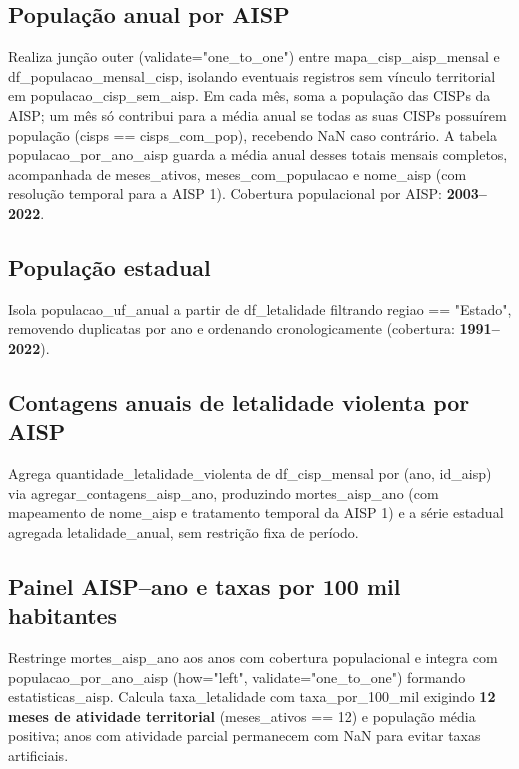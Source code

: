 \documentclass[11pt,a4paper]{article}
\newcommand{\code}[1]{{\ttfamily\footnotesize\allowbreak #1}}
\begin{document}
\subsection{População anual por AISP}
Realiza junção \code{outer} (\code{validate="one\_to\_one"}) entre \code{mapa\_cisp\_aisp\_mensal} e \code{df\_populacao\_mensal\_cisp}, isolando eventuais registros sem vínculo territorial em \code{populacao\_cisp\_sem\_aisp}. Em cada mês, soma a população das CISPs da AISP; um mês só contribui para a média anual se todas as suas CISPs possuírem população (\code{cisps == cisps\_com\_pop}), recebendo \code{NaN} caso contrário. A tabela \code{populacao\_por\_ano\_aisp} guarda a média anual desses totais mensais completos, acompanhada de \code{meses\_ativos}, \code{meses\_com\_populacao} e \code{nome\_aisp} (com resolução temporal para a AISP 1). Cobertura populacional por AISP: \textbf{2003--2022}.

\subsection{População estadual}
Isola \code{populacao\_uf\_anual} a partir de \code{df\_letalidade} filtrando \code{regiao == "Estado"}, removendo duplicatas por \code{ano} e ordenando cronologicamente (cobertura: \textbf{1991--2022}).

\subsection{Contagens anuais de letalidade violenta por AISP}
Agrega \code{quantidade\_letalidade\_violenta} de \code{df\_cisp\_mensal} por \code{(ano, id\_aisp)} via \code{agregar\_contagens\_aisp\_ano}, produzindo \code{mortes\_aisp\_ano} (com mapeamento de \code{nome\_aisp} e tratamento temporal da AISP 1) e a série estadual agregada \code{letalidade\_anual}, sem restrição fixa de período.

\subsection{Painel AISP--ano e taxas por 100 mil habitantes}
Restringe \code{mortes\_aisp\_ano} aos anos com cobertura populacional e integra com \code{populacao\_por\_ano\_aisp} (\code{how="left", validate="one\_to\_one"}) formando \code{estatisticas\_aisp}. Calcula \code{taxa\_letalidade} com \code{taxa\_por\_100\_mil} exigindo \textbf{12 meses de atividade territorial} (\code{meses\_ativos == 12}) e população média positiva; anos com atividade parcial permanecem com \code{NaN} para evitar taxas artificiais.
\end{document}
